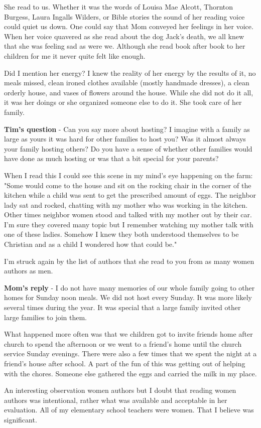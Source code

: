 She read to us.
Whether it was the words of Louisa Mae Alcott, Thornton Burgess, Laura Ingalls Wilders, or Bible stories the sound of her reading voice could quiet us down.
One could say that Mom conveyed her feelings in her voice.
When her voice quavered as she read about the dog Jack's death, we all knew that she was feeling sad as were we.
Although she read book after book to her children for me it never quite felt like enough.

Did I mention her energy? I knew the reality of her energy by the results of it, no meals missed, clean ironed clothes available (mostly handmade dresses), a clean orderly house, and vases of flowers around the house.
While she did not do it all, it was her doings or she organized someone else to do it.
She took care of her family.

\textbf{Tim's question} - Can you say more about hosting? I imagine with a family as large as yours it was hard for other families to host you? Was it almost always your family hosting others? Do you have a sense of whether other families would have done as much hosting or was that a bit special for your parents?

When I read this I could see this scene in my mind's eye happening on the farm:
"Some would come to the house and sit on the rocking chair in the corner of the kitchen while a child was sent to get the prescribed amount of eggs.
The neighbor lady sat and rocked, chatting with my mother who was working in the kitchen.
Other times neighbor women stood and talked with my mother out by their car.
I'm sure they covered many topic but I remember watching my mother talk with one of these ladies.
Somehow I knew they both understood themselves to be Christian and as a child I wondered how that could be."

I'm struck again by the list of authors that she read to you from as many women authors as men.

\textbf{Mom's reply} - I do not have many memories of our whole family going to other homes for Sunday noon meals.
We did not host every Sunday.
It was more likely several times during the year.
It was special that a large family invited other large families to join them.

What happened more often was that we children got to invite friends home after church to spend the afternoon or we went to a friend's home until the church service Sunday evenings.
There were also a few times that we spent the night at a friend's house after school.
A part of the fun of this was getting out of helping with the chores.
Someone else gathered the eggs and carried the milk in my place.

An interesting observation women authors but I doubt that reading women authors was intentional, rather what was available and acceptable in her evaluation.
All of my elementary school teachers were women.
That I believe was significant.

